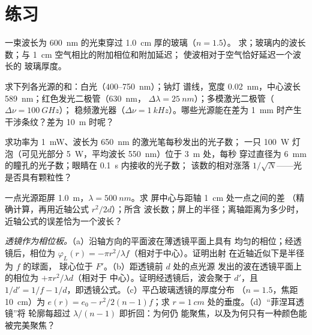 \section{练习}

\begin{exercise}[$\star$]\label{exo:b2:scalar-light-model:1}
一束波长为 \qty{600}{nm} 的光束穿过 \qty{1.0}{cm} 厚的玻璃（$n = 1.5$）。
求；玻璃内的波长数；与 \qty{1}{cm} 空气相比的附加相位和附加延迟；
使波相对于空气恰好延迟一个波长的
玻璃厚度。
\end{exercise}

\begin{exercise}[$\star$]\label{exo:b2:scalar-light-model:2}
求下列各光源的和：白光（$400$--\qty{750}{nm}）；钠灯
谱线，宽度 \qty{0.02}{nm}，中心波长 \qty{589}{nm}；红色发光二极管（\qty{630}{nm}，
$\Delta\lambda = \qty{25}{nm}$）；多模激光二极管（$\Delta\nu = \qty{100}{GHz}$）；
稳频激光器（$\Delta\nu = \qty{1}{kHz}$）。哪些光源能在差为
\qty{1}{mm} 时产生干涉条纹？差为 \qty{10}{m} 时呢？
\end{exercise}

\begin{exercise}[$\star$]\label{exo:b2:scalar-light-model:3}
求功率为 \qty{1}{mW}、波长为 \qty{650}{nm} 的激光笔每秒发出的光子数；
一只 \qty{100}{W} 灯泡（可见光部分 \qty{5}{W}，平均波长 \qty{550}{nm}）位于 \qty{3}{m} 处，每秒
穿过直径为 \qty{6}{mm} 的瞳孔的光子数；眼睛在 \qty{0.1}{s} 内接收的光子数；
该数的相对涨落 $1/\sqrt N$——光是否具有颗粒性？
\end{exercise}

\begin{exercise}[$\star$]\label{exo:b2:scalar-light-model:4}
一点光源距屏 \qty{1.0}{m}，$\lambda = \qty{500}{nm}$。求
屏中心与距轴 \qty{1}{cm} 处一点之间的差
（精确计算，再用近轴公式 $r^2/2d$）；所含
波长数；屏上的半径；离轴距离为多少时，
近轴公式的误差恰为一个波长？
\end{exercise}

\begin{exercise}[$\star\star$]\label{exo:b2:scalar-light-model:5}
\emph{透镜作为相位板。}（a）沿轴方向的平面波在薄透镜平面上具有
均匀的相位；经透镜后，相位为
$\varphi_L(r) = -\pi r^2/\lambda f$（相对于中心）。证明出射
在近轴近似下是半径为 $f$ 的球面，
球心位于 $F'$。（b）距透镜前 $d$ 处的点光源
发出的波在透镜平面上的相位为 $+\pi r^2/\lambda d$（相对于
中心）。证明经透镜后，波会聚于 $d'$，且
$1/d' = 1/f - 1/d$，即透镜公式。（c）平凸玻璃透镜的厚度分布
（$n = 1.5$，焦距 \qty{10}{cm}）为 $e(r) =
e_0 - r^2/2(n - 1)f$；求 $r = \qty{1}{cm}$ 处的垂度。（d）“菲涅耳透镜”将
轮廓每超过 $\lambda/(n - 1)$ 即折回：为何仍
能聚焦，以及为何只有一种颜色能被完美聚焦？
\end{exercise}

